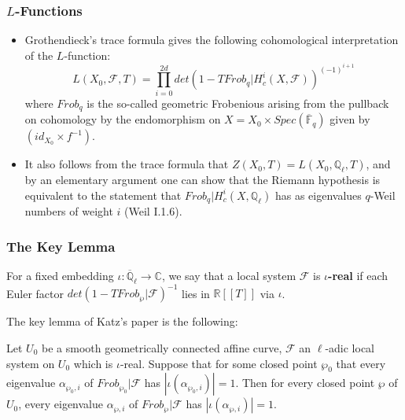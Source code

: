 \documentclass{beamer}
\begin{document}
\begin{frame}
\frametitle{$L$-Functions}
\begin{itemize}
\pause
\item Grothendieck's trace formula gives the following cohomological interpretation of the $L$-function:
$$L(X_0,\mathcal{F},T) = \prod\limits_{i=0}^{2d}det(1-TFrob_{q}|H_{c}^{i}(X,\mathcal{F}))^{(-1)^{i+1}}$$
where $Frob_{q}$ is the so-called geometric Frobenious arising from the pullback on cohomology by the endomorphism on $X = X_0\times Spec(\overline{\mathbb{F}}_{q})$ given by $(id_{X_0}\times f^{-1}).$
\pause
\item It also follows from the trace formula that $Z(X_0,T) = L(X_0,\mathbb{Q}_{\ell},T)$, and by an elementary argument one can show that the Riemann hypothesis is equivalent to the statement that $Frob_{q}|H_{c}^{i}(X,\mathbb{Q}_{\ell})$ has as eigenvalues $q$-Weil numbers of weight $i$ (Weil I.1.6). 
\end{itemize}
\end{frame}



\begin{frame}
\frametitle{The Key Lemma}
For a fixed embedding $\iota:\overline{\mathbb{Q}}_{\ell} \rightarrow \mathbb{C}$, we say that a local system $\mathcal{F}$ is \textbf{$\iota$-real} if each Euler factor $det(1-TFrob_{\wp}|\mathcal{F})^{-1}$ lies in $\mathbb{R}[[T]]$ via $\iota$. 

\pause
The key lemma of Katz's paper is the following: 
\pause
\begin{lemma}
Let $U_0$ be a smooth geometrically connected affine  curve, $\mathcal{F}$ an $\ell$-adic local system on $U_0$ which is $\iota$-real. Suppose that for some closed point $\wp_{0}$ that every eigenvalue $\alpha_{\wp_{0},i}$ of $Frob_{\wp_0}|\mathcal{F}$ has $|\iota(\alpha_{\wp_{0},i})| =1$. Then for every closed point $\wp$ of $U_0$, every eigenvalue $\alpha_{\wp,i}$ of $Frob_{\wp}|\mathcal{F}$ has $|\iota(\alpha_{\wp,i})| = 1$. 
\end{lemma}
\end{frame}
\end{document}
